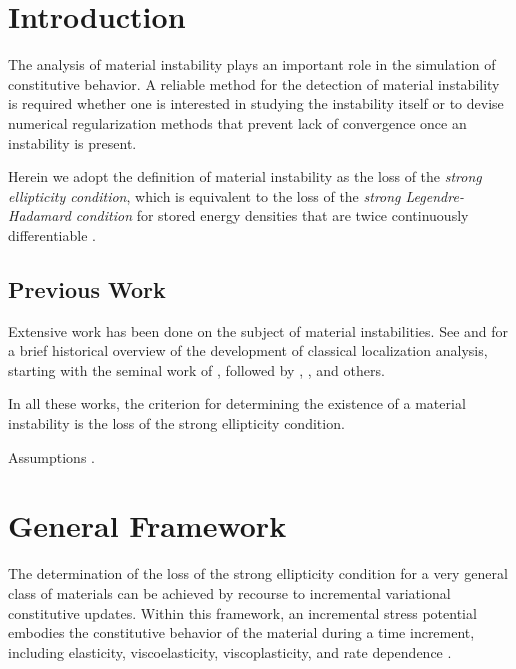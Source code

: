 \documentclass[12pt]{article}
\numberwithin{equation}{section}
\begin{document}
\section{Introduction}
\label{sec:intro}
The analysis of material instability plays an important role in the
simulation of constitutive behavior. A reliable method for the
detection of material instability is required whether one is
interested in studying the instability itself or to devise numerical
regularization methods that prevent lack of convergence once an
instability is present.

Herein we adopt the definition of material instability as the loss of
the \emph{strong ellipticity condition}, which is equivalent to the
loss of the \emph{strong Legendre-Hadamard condition} for stored
energy densities that are twice continuously differentiable
\citep{Antman:2005}.

\subsection{Previous Work}

Extensive work has been done on the subject of material
instabilities. See \citet*{Armero.Garikipati:1996} and
\citet*{Miehe.Lambrecht.Gurses:2004} for a brief historical overview
of the development of classical localization analysis, starting with
the seminal work of \citet{Hadamard:1903}, followed by
\citet{Thomas:1961}, \citet{Hill:1962}, \citet{Rice:1976} and others.

In all these works, the criterion for determining the existence of a
material instability is the loss of the strong ellipticity condition.

Assumptions \citep{Becker:2002}.

\section{General Framework}

The determination of the loss of the strong ellipticity condition for
a very general class of materials can be achieved by recourse to
incremental variational constitutive updates. Within this framework,
an incremental stress potential embodies the constitutive behavior of
the material during a time increment, including elasticity,
viscoelasticity, viscoplasticity, and rate dependence
\citep{Ortiz.Stainier:1999, Lambrecht.Miehe.Dettmar:2003,
  Miehe.Lambrecht.Gurses:2004, Weinberg.etal:2006,
  Fancello.Ponthot.Stainier:2006, Mosler.Bruhns:2010,
  Bleier.Mosler:2012}.
\end{document}

